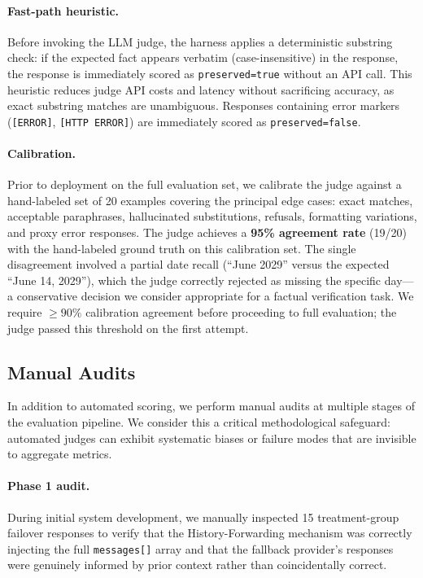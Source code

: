 \paragraph{Fast-path heuristic.}
Before invoking the LLM judge, the harness applies a deterministic substring check: if the expected fact appears verbatim (case-insensitive) in the response, the response is immediately scored as \texttt{preserved=true} without an API call. This heuristic reduces judge API costs and latency without sacrificing accuracy, as exact substring matches are unambiguous. Responses containing error markers (\texttt{[ERROR]}, \texttt{[HTTP ERROR]}) are immediately scored as \texttt{preserved=false}.

\paragraph{Calibration.}
Prior to deployment on the full evaluation set, we calibrate the judge against a hand-labeled set of 20 examples covering the principal edge cases: exact matches, acceptable paraphrases, hallucinated substitutions, refusals, formatting variations, and proxy error responses. The judge achieves a \textbf{95\% agreement rate} (19/20) with the hand-labeled ground truth on this calibration set. The single disagreement involved a partial date recall (``June 2029'' versus the expected ``June 14, 2029''), which the judge correctly rejected as missing the specific day---a conservative decision we consider appropriate for a factual verification task. We require $\geq 90\%$ calibration agreement before proceeding to full evaluation; the judge passed this threshold on the first attempt.

\subsection{Manual Audits}

In addition to automated scoring, we perform manual audits at multiple stages of the evaluation pipeline. We consider this a critical methodological safeguard: automated judges can exhibit systematic biases or failure modes that are invisible to aggregate metrics.

\paragraph{Phase 1 audit.}
During initial system development, we manually inspected 15 treatment-group failover responses to verify that the History-Forwarding mechanism was correctly injecting the full \texttt{messages[]} array and that the fallback provider's responses were genuinely informed by prior context rather than coincidentally correct.

